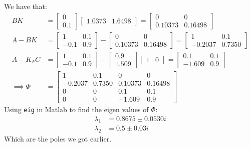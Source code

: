 \documentclass[11pt, a4paper, english]{NTNUoving}
\begin{document}
\begin{oppgave}
    \begin{punkt}
        We have that:
        \begin{align*}
            BK &= \begin{bmatrix}
                0 \\ 0.1
            \end{bmatrix} \begin{bmatrix}
                1.0373 & 1.6498
            \end{bmatrix} = \begin{bmatrix}
                0 & 0 \\
                0.10373 & 0.16498
            \end{bmatrix} \\
            A - BK &= \begin{bmatrix}
                1 & 0.1 \\
                -0.1 & 0.9
            \end{bmatrix} - \begin{bmatrix}
                0 & 0 \\
                0.10373 & 0.16498
            \end{bmatrix} = \begin{bmatrix}
                1 & 0.1 \\
                -0.2037 & 0.7350
            \end{bmatrix} \\
            A - K_F C &= \begin{bmatrix}
                1 & 0.1 \\
                -0.1 & 0.9
            \end{bmatrix} - \begin{bmatrix}
                0.9 \\ 1.509
            \end{bmatrix} \begin{bmatrix}
                1 & 0
            \end{bmatrix}
            = \begin{bmatrix}
                0.1 & 0.1 \\
                -1.609 & 0.9
            \end{bmatrix}
            \\
        \implies \Phi &= \begin{bmatrix}
            1 & 0.1 & 0 & 0 \\
            -0.2037 & 0.7350 & 0.10373 & 0.16498 \\
            0 & 0 & 0.1 & 0.1 \\
            0 & 0 & -1.609 & 0.9
        \end{bmatrix}
        \end{align*}
        Using \texttt{eig} in Matlab to find the eigen values of $\Phi$:
        \begin{align*}
            \lambda_1 &= 0.8675 \pm 0.0530i \\
            \lambda_2 &= 0.5 \pm 0.03i
        \end{align*}
        Which are the poles we got earlier.
    \end{punkt}
\end{oppgave}
\end{document}
